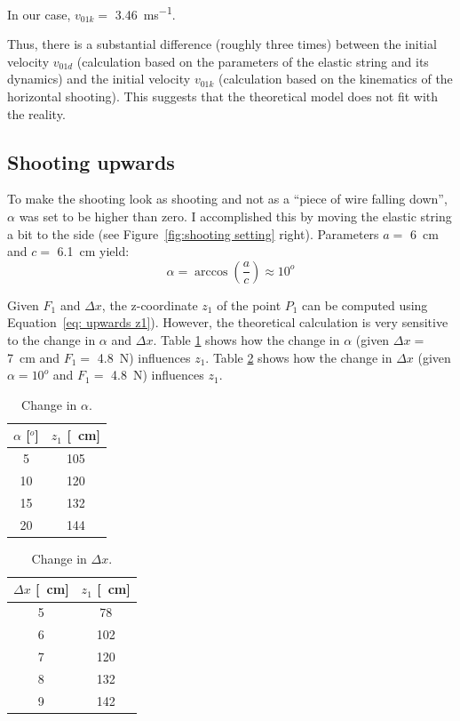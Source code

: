 			In our case, $ v_{01k} = $ \SI{3.46}{ms^{-1}}.
			
			Thus, there is a substantial difference (roughly three times) between the initial velocity $v_{01d}$ (calculation based on the parameters of the elastic string and its dynamics) and the initial velocity $v_{01k}$ (calculation based on the kinematics of the horizontal shooting). This suggests that the theoretical model does not fit with the reality.
			
		\subsection{Shooting upwards}
			To make the shooting look as shooting and not as a ``piece of wire falling down'', $ \alpha$ was set to be higher than zero. I accomplished this by moving the elastic string a bit to the side (see Figure~\ref{fig:shooting setting} right). Parameters $ a = $ \SI{6}{cm} and $ c = $ \SI{6.1}{cm} yield:
			\begin{equation}
				\alpha = \arccos \left(\frac{a}{c} \right) \approx 10^{o}
			\end{equation}
			
			Given $ F_1$ and $ \Delta x$, the z-coordinate $ z_1$ of the point $ P_1$ can be computed using Equation~\eqref{eq: upwards z1}). However, the theoretical calculation is very sensitive to the change in $ \alpha$ and $ \Delta x$. Table \ref{table: change in alpha} shows how the change in $ \alpha$ (given $\Delta x = $ \SI{7}{cm} and $F_1 = $ \SI{4.8}{N}) influences $z_1$. Table \ref{table: change in dx} shows how the change in $ \Delta x$ (given $ \alpha = 10^{o}$ and $F_1 = $ \SI{4.8}{N}) influences $z_1$.

			\begin{table}\centering
			\begin{tabular}{@{}cc@{}}\toprule
			$\alpha$ [$^{o}$] & $ z_1$ [\SI{}{cm}] \\ \midrule
			
			5  & 105 \\
			10 & 120 \\
			15 & 132 \\
			20 & 144 \\
			 \bottomrule
			\end{tabular}
			\caption{Change in $\alpha$.}
			\label{table: change in alpha}
			\end{table}
			
			\begin{table}\centering
			\begin{tabular}{@{}cc@{}}\toprule
			$\Delta x$ [\SI{}{cm}] & $ z_1$ [\SI{}{cm}] \\ \midrule
			
			5 & 78 \\
			6 & 102 \\
			7 & 120 \\
			8 & 132 \\
			9 & 142 \\
			\bottomrule
			\end{tabular}
			\caption{Change in $ \Delta x$.}
			\label{table: change in dx}
			\end{table}
			
